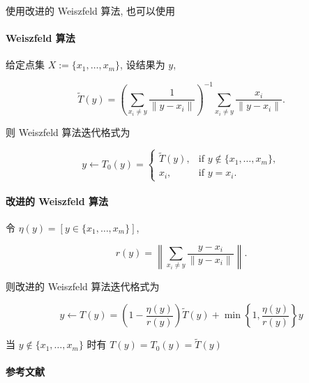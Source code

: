 使用改进的 Weiszfeld 算法, 也可以使用 

\paragraph{Weiszfeld 算法}

给定点集 \(X:=\{x_1,\dots,x_m\}\), 设结果为 \(y\),

\[
    \tilde{T}(y)=\left(\sum_{x_i\neq y} \frac{1}{\lVert y-x_i\rVert}\right)^{-1}\sum_{x_i\neq y} \frac{x_i}{\lVert y-x_i\rVert}.
\]

则 Weiszfeld 算法迭代格式为

\[
    y\gets T_0(y)=\begin{cases}
        \tilde{T}(y), & \text{if } y\notin\{x_1,\dots,x_m\}, \\
        x_i,          & \text{if } y=x_i.
    \end{cases}
\]

\paragraph{改进的 Weiszfeld 算法}

令 \(\eta(y)=[y\in\{x_1,\dots,x_m\}]\),

\[
    r(y)=\left\lVert\sum_{x_i\neq y} \frac{y-x_i}{\lVert y-x_i\rVert}\right\rVert.
\]

则改进的 Weiszfeld 算法迭代格式为

\[
    y\gets T(y)=\left(1-\frac{\eta(y)}{r(y)}\right)\tilde{T}(y)+\min\left\{1,\frac{\eta(y)}{r(y)}\right\}y
\]

当 \(y\notin\{x_1,\dots,x_m\}\) 时有 \(T(y)=T_0(y)=\tilde{T}(y)\)

\paragraph{参考文献} \cite{katz1974local} \cite{brimberg1992local} \cite{vardi2000multivariate}